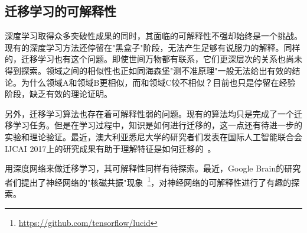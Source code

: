 \subsection{迁移学习的可解释性}

深度学习取得众多突破性成果的同时，其面临的可解释性不强却始终是一个挑战。现有的深度学习方法还停留在"黑盒子"阶段，无法产生足够有说服力的解释。同样的，迁移学习也有这个问题。即使世间万物都有联系，它们更深层次的关系也尚未得到探索。领域之间的相似性也正如同海森堡"测不准原理"一般无法给出有效的结论。为什么领域A和领域B更相似，而和领域C较不相似？目前也只是停留在经验阶段，缺乏有效的理论证明。

另外，迁移学习算法也存在着可解释性弱的问题。现有的算法均只是完成了一个迁移学习任务。但是在学习过程中，知识是如何进行迁移的，这一点还有待进一步的实验和理论验证。最近，澳大利亚悉尼大学的研究者们发表在国际人工智能联合会IJCAI 2017上的研究成果有助于理解特征是如何迁移的~\cite{liu2017understanding}。

用深度网络来做迁移学习，其可解释性同样有待探索。最近，Google Brain的研究者们提出了神经网络的"核磁共振"现象~\footnote{\url{https://github.com/tensorflow/lucid}}，对神经网络的可解释性进行了有趣的探索。

